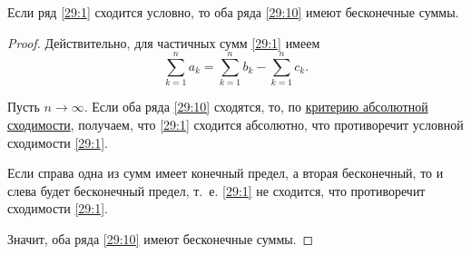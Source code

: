 \documentclass[../../main.tex]{subfiles}
\begin{document}
	\begin{thm}\label{29:conditional_conv}
		Если ряд \eqref{29:1} сходится условно, 
		то оба ряда \eqref{29:10} имеют бесконечные суммы.
	\end{thm}
	\begin{proof}
		Действительно, для частичных сумм \eqref{29:1} имеем 
		\[\sum_{k = 1}^n a_k = \sum_{k = 1}^n b_k - \sum_{k = 1}^n c_k.\]
		
		Пусть $n\to\infty$. Если оба ряда \eqref{29:10} сходятся, 
		то, по \href{29:absolute_conv}{критерию абсолютной сходимости}, 
		получаем, что \eqref{29:1} сходится абсолютно, что противоречит 
		условной сходимости \eqref{29:1}.
		
		Если справа одна из сумм имеет конечный предел, а вторая бесконечный,
		 то и слева будет бесконечный предел, т.~е. \eqref{29:1} не сходится,
		  что противоречит сходимости \eqref{29:1}.
		
		Значит, оба ряда \eqref{29:10} имеют бесконечные суммы.
	\end{proof}
\end{document}
